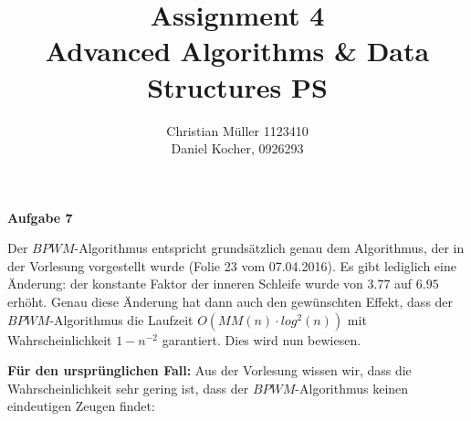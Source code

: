\documentclass{article}
\begin{document}
\title{Assignment 4 \\ Advanced Algorithms \& Data Structures PS}%
\author{Christian Müller 1123410 \\ Daniel Kocher, 0926293}%
\maketitle

{\noindent\bfseries Aufgabe 7}%
\medskip%

\begin{algorithm}
%
\end{algorithm}

\noindent
Der $BPWM$-Algorithmus entspricht grunds{\"a}tzlich genau dem Algorithmus, der
in der Vorlesung vorgestellt wurde (Folie 23 vom 07.04.2016). Es gibt lediglich
eine {\"A}nderung: der konstante Faktor der inneren Schleife wurde von $3.77$ auf
$6.95$ erh{\"o}ht. Genau diese {\"A}nderung hat dann auch den gew{\"u}nschten
Effekt, dass der $BPWM$-Algorithmus die Laufzeit
$O \left( MM \left( n \right) \cdot log^2(n) \right)$ mit
Wahrscheinlichkeit $1 - n^{-2}$ garantiert. Dies wird nun bewiesen.

\clearpage

{\bfseries F{\"u}r den urspr{\"u}nglichen Fall:} \newline
Aus der Vorlesung wissen wir, dass die Wahrscheinlichkeit sehr gering ist, dass
der $BPWM$-Algorithmus keinen eindeutigen Zeugen findet:
\end{document}
